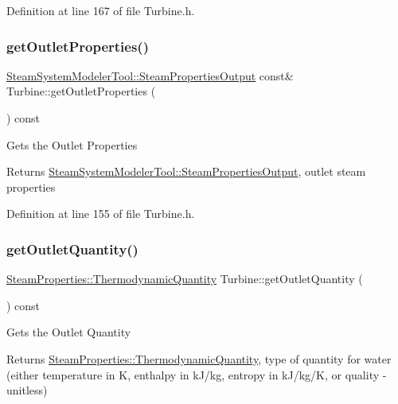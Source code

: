 Definition at line 167 of file Turbine.\+h.

\mbox{\label{class_turbine_aa9449622449e78285a258823ff77c8ec}} 
\subsubsection{\texorpdfstring{get\+Outlet\+Properties()}{getOutletProperties()}}
{\footnotesize\ttfamily \hyperlink{struct_steam_system_modeler_tool_1_1_steam_properties_output}{Steam\+System\+Modeler\+Tool\+::\+Steam\+Properties\+Output} const\& Turbine\+::get\+Outlet\+Properties (\begin{DoxyParamCaption}{ }\end{DoxyParamCaption}) const\hspace{0.3cm}{\ttfamily [inline]}}

Gets the Outlet Properties

\begin{DoxyReturn}{Returns}
\hyperlink{struct_steam_system_modeler_tool_1_1_steam_properties_output}{Steam\+System\+Modeler\+Tool\+::\+Steam\+Properties\+Output}, outlet steam properties 
\end{DoxyReturn}


Definition at line 155 of file Turbine.\+h.

\mbox{\label{class_turbine_acd3e98ab67754b652de97498d9bec6d2}} 
\subsubsection{\texorpdfstring{get\+Outlet\+Quantity()}{getOutletQuantity()}}
{\footnotesize\ttfamily \hyperlink{class_steam_properties_ae0294bedf7d178c2d8fb6aed0f62fbff}{Steam\+Properties\+::\+Thermodynamic\+Quantity} Turbine\+::get\+Outlet\+Quantity (\begin{DoxyParamCaption}{ }\end{DoxyParamCaption}) const\hspace{0.3cm}{\ttfamily [inline]}}

Gets the Outlet Quantity

\begin{DoxyReturn}{Returns}
\hyperlink{class_steam_properties_ae0294bedf7d178c2d8fb6aed0f62fbff}{Steam\+Properties\+::\+Thermodynamic\+Quantity}, type of quantity for water (either temperature in K, enthalpy in k\+J/kg, entropy in k\+J/kg/K, or quality -\/ unitless) 
\end{DoxyReturn}


